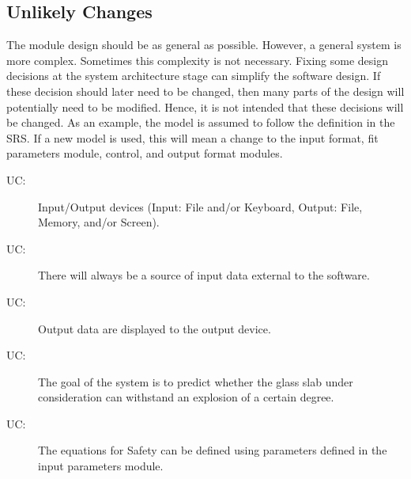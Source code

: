 \documentclass[12pt]{article}
\newcounter{ucnum}
\newcommand{\uctheucnum}{UC\theucnum}
\begin{document}
\subsection{Unlikely Changes}
\label{Sec:UnliChan}
The module design should be as general as possible. However, a general system is more complex. Sometimes this complexity is not necessary. Fixing some design decisions at the system architecture stage can simplify the software design. If these decision should later need to be changed, then many parts of the design will potentially need to be modified. Hence, it is not intended that these decisions will be changed.  As an example, the model is assumed to follow the definition in the SRS.  If a new model is used, this will mean a change to the input format, fit parameters module, control, and output format modules.
\begin{description}
\item[\uctheucnum\label{UC:IO}:]Input/Output devices (Input: File and/or Keyboard, Output: File, Memory, and/or Screen).
\end{description}
\begin{description}
\item[\uctheucnum\label{UC:inputsource}:]There will always be a source of input data external to the software.
\end{description}
\begin{description}
\item[\uctheucnum\label{UC:output}:]Output data are displayed to the output device.
\end{description}
\begin{description}
\item[\uctheucnum\label{UC:goal}:]The goal of the system is to predict whether the glass slab under consideration can withstand an explosion of a certain degree.
\end{description}
\begin{description}
\item[\uctheucnum\label{UC:equations}:]The equations for Safety can be defined using parameters defined in the input parameters module.
\end{description}
\end{document}
